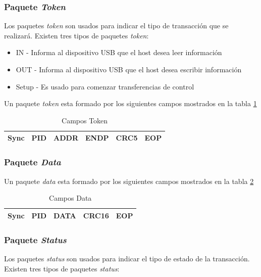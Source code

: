 \subsubsection{Paquete \emph{Token}}
Los paquetes \emph{token} son usados para indicar el tipo de transacci\'on que
se realizar\'a. Existen tres tipos de paquetes \emph{token}:

\begin{itemize}
 \item IN - Informa al dispositivo USB que el host desea leer informaci\'on
 \item OUT - Informa al dispositivo USB que el host desea escribir
informaci\'on
 \item Setup - Es usado para comenzar transferencias de control
\end{itemize}

Un paquete \emph{token} esta formado por los siguientes campos mostrados en la
tabla \ref{tab:usb_token_fields}


\begin{table}[ht]
\centering
\begin{tabular}{|c|c|c|c|c|c|} \hline
Sync & PID & ADDR & ENDP & CRC5 & EOP\\ \hline
\end{tabular}
\caption{Campos Token} 
\label{tab:usb_token_fields}
\end{table}


\subsubsection{Paquete \emph{Data}}
Un paquete \emph{data} esta formado por los siguientes campos mostrados en la
tabla \ref{tab:usb_data_fields}

\begin{table}[ht]
\centering
\begin{tabular}{|c|c|c|c|c|} \hline
Sync & PID & DATA & CRC16 & EOP\\ \hline
\end{tabular}
\caption{Campos Data} 
\label{tab:usb_data_fields}
\end{table}


\subsubsection{Paquete \emph{Status}}
Los paquetes \emph{status} son usados para indicar el tipo de estado de la
transacci\'on. Existen tres tipos de paquetes \emph{status}:

